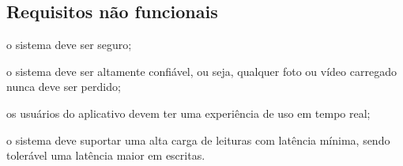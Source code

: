 \subsection{Requisitos não funcionais}
\label{s.requisitos-nao-funcionais}

\begin{alineas}
	\item o sistema deve ser seguro;
	\item o sistema deve ser altamente confiável, ou seja, qualquer foto ou vídeo carregado nunca deve ser perdido;
	\item os usuários do aplicativo devem ter uma experiência de uso em tempo real;
	\item o sistema deve suportar uma alta carga de leituras com latência mínima, sendo tolerável uma latência maior em escritas.
\end{alineas}
